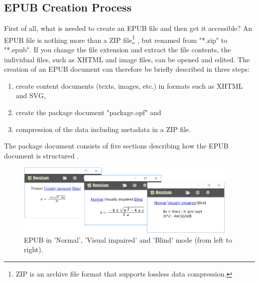 \documentclass[runningheads,a4paper]{llncs}
\begin{document}
\subsection{EPUB Creation Process}
First of all, what is needed to create an EPUB file and then get it accessible? An EPUB file is nothing more than a ZIP file\footnote{ZIP is an archive file format that supports lossless data compression.} \cite{WhatIsEpub3}, but renamed from "*.zip" to "*.epub". If you change the file extension and extract the file contents, the individual files, such as XHTML and image files, can be opened and edited. The creation of an EPUB document can therefore be briefly described in three steps: 
\begin{enumerate}
\item create content documents (texts, images, etc.) in formats such as XHTML and SVG, 
\item create the package document "package.opf" and 
\item compression of the data including metadata in a ZIP file.
\end{enumerate}
The package document consists of five sections describing how the EPUB document is structured \cite{EPUB3bp}.
\begin{figure}
	\centering
	\includegraphics[width=0.95\textwidth]{Equations.png} 
	\caption{EPUB in 'Normal', 'Visual impaired' and 'Blind' mode (from left to right).}
	\label{fig:epub_normal}
\end{figure}
\end{document}
